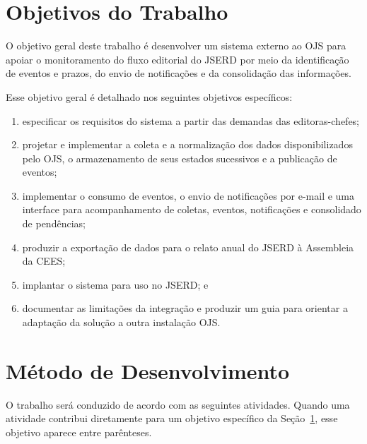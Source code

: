 \section{Objetivos do Trabalho}
\label{sec-intro-obj}

O objetivo geral deste trabalho é desenvolver um sistema externo ao OJS para apoiar o monitoramento do fluxo editorial do JSERD por meio da identificação de eventos e prazos, do envio de notificações e da consolidação das informações.

Esse objetivo geral é detalhado nos seguintes objetivos específicos:

\begin{enumerate}[label=\roman*.]
    \item especificar os requisitos do sistema a partir das demandas das editoras-chefes;
    \item projetar e implementar a coleta e a normalização dos dados disponibilizados pelo OJS, o armazenamento de seus estados sucessivos e a publicação de eventos;
    \item implementar o consumo de eventos, o envio de notificações por e-mail e uma interface para acompanhamento de coletas, eventos, notificações e consolidado de pendências;
    \item produzir a exportação de dados para o relato anual do JSERD à Assembleia da CEES;
    \item implantar o sistema para uso no JSERD; e
    \item documentar as limitações da integração e produzir um guia para orientar a adaptação da solução a outra instalação OJS.
\end{enumerate}

\section{Método de Desenvolvimento}
\label{sec-intro-met}

O trabalho será conduzido de acordo com as seguintes atividades. Quando uma atividade contribui diretamente para um objetivo específico da Seção~\ref{sec-intro-obj}, esse objetivo aparece entre parênteses.

